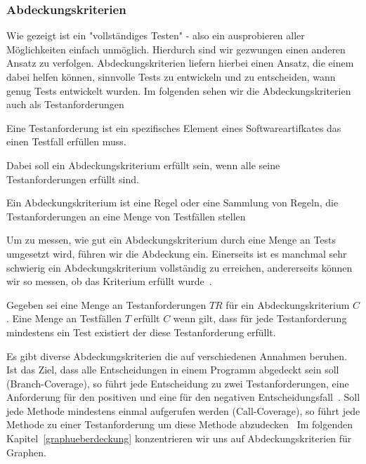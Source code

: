\subsubsection{Abdeckungskriterien}

Wie gezeigt ist ein "vollständiges Testen" - also ein ausprobieren aller Möglichkeiten einfach unmöglich.
Hierdurch sind wir gezwungen einen anderen Ansatz zu verfolgen.
Abdeckungskriterien liefern hierbei einen Ansatz, die einem dabei helfen können, sinnvolle Tests zu entwickeln und zu entscheiden, wann genug Tests entwickelt wurden.
Im folgenden sehen wir die Abdeckungskriterien auch als Testanforderungen~\cite[vgl. 1.3 Coverage Criteria for Testing]{software-testing}

\begin{definition}
    Eine Testanforderung ist ein spezifisches Element eines Softwareartifkates das einen Testfall erfüllen muss.~\cite[Def. 1.20]{software-testing}
    \label{tr}
\end{definition}

Dabei soll ein Abdeckungskriterium erfüllt sein, wenn alle seine Testanforderungen erfüllt sind.

\begin{definition}
    Ein Abdeckungskriterium ist eine Regel oder eine Sammlung von Regeln, die Testanforderungen an eine Menge von Testfällen stellen~\cite[Def. 1.21]{software-testing}
\end{definition}

Um zu messen, wie gut ein Abdeckungskriterium durch eine Menge an Tests umgesetzt wird, führen wir die Abdeckung ein.
Einerseits ist es manchmal sehr schwierig ein Abdeckungskriterium vollständig zu erreichen, andererseits können
wir so messen, ob das Kriterium erfüllt wurde~\cite[vgl. S. 18]{software-testing}.

\begin{definition}
    Gegeben sei eine Menge an Testanforderungen $TR$ für ein Abdeckungskriterium $C$. 
    Eine Menge an Testfällen $T$ erfüllt $C$ wenn gilt, 
    dass für jede Testanforderung mindestens ein Test existiert der diese Testanforderung erfüllt.~\cite[vgl. Def. 1.22]{software-testing}
\end{definition}

Es gibt diverse Abdeckungskriterien die auf verschiedenen Annahmen beruhen.
Ist das Ziel, dass alle Entscheidungen in einem Programm abgedeckt sein soll (Branch-Coverage), so führt jede Entscheidung zu zwei
Testanforderungen, eine Anforderung für den positiven und eine für den negativen Entscheidungsfall~\cite[vgl. S. 17]{software-testing}.
Soll jede Methode mindestens einmal aufgerufen werden (Call-Coverage), so führt jede Methode zu einer Testanforderung um diese Methode abzudecken~\cite[vgl. S. 17]{software-testing}
Im folgenden Kapitel~\ref{graphueberdeckung} konzentrieren wir uns auf Abdeckungskriterien für Graphen.